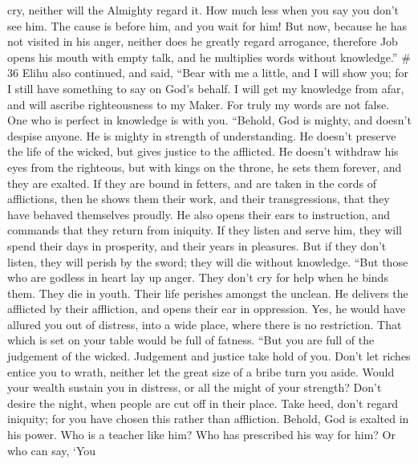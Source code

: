 cry, neither will the Almighty regard it.  How much less
when you say you don't see him. The cause is before him, and you wait
for him!  But now, because he has not visited in his anger,
neither does he greatly regard arrogance,  therefore Job
opens his mouth with empty talk, and he multiplies words without
knowledge.'' \# 36  Elihu also continued, and said,
 ``Bear with me a little, and I will show you; for I still
have something to say on God's behalf.  I will get my
knowledge from afar, and will ascribe righteousness to my Maker.
 For truly my words are not false. One who is perfect in
knowledge is with you.  ``Behold, God is mighty, and doesn't
despise anyone. He is mighty in strength of understanding. 
He doesn't preserve the life of the wicked, but gives justice to the
afflicted.  He doesn't withdraw his eyes from the righteous,
but with kings on the throne, he sets them forever, and they are
exalted.  If they are bound in fetters, and are taken in the
cords of afflictions,  then he shows them their work, and
their transgressions, that they have behaved themselves proudly.
 He also opens their ears to instruction, and commands that
they return from iniquity.  If they listen and serve him,
they will spend their days in prosperity, and their years in pleasures.
 But if they don't listen, they will perish by the sword;
they will die without knowledge.  ``But those who are
godless in heart lay up anger. They don't cry for help when he binds
them.  They die in youth. Their life perishes amongst the
unclean.  He delivers the afflicted by their affliction,
and opens their ear in oppression.  Yes, he would have
allured you out of distress, into a wide place, where there is no
restriction. That which is set on your table would be full of fatness.
 ``But you are full of the judgement of the wicked.
Judgement and justice take hold of you.  Don't let riches
entice you to wrath, neither let the great size of a bribe turn you
aside.  Would your wealth sustain you in distress, or all
the might of your strength?  Don't desire the night, when
people are cut off in their place.  Take heed, don't regard
iniquity; for you have chosen this rather than affliction. 
Behold, God is exalted in his power. Who is a teacher like him?
 Who has prescribed his way for him? Or who can say, `You
